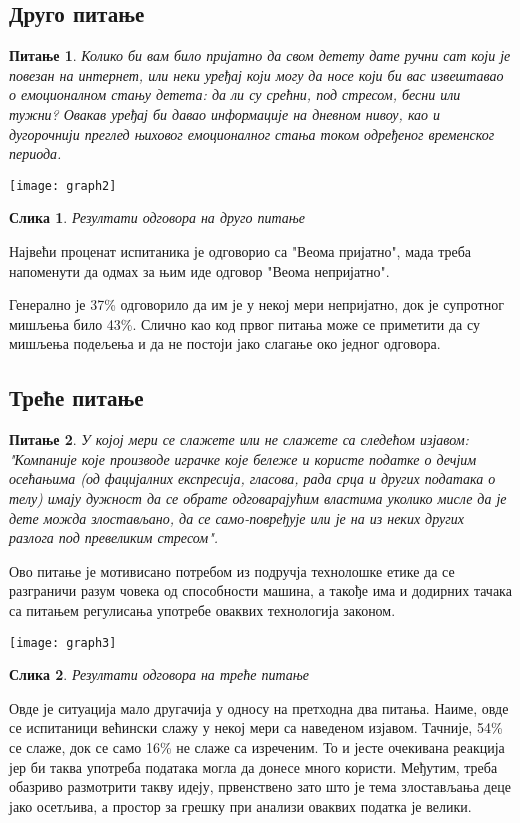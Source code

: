\documentclass{article}
\newtheorem{question}{Питање}
\newtheorem{image}{Слика}
\begin{document}
\subsection{Друго питање}
\begin{question}
Колико би вам било пријатно да свом детету дате ручни сат који је повезан на интернет, или неки уређај који могу да носе који би вас извештавао о емоционалном стању детета: да ли су срећни, под стресом, бесни или тужни? Овакав уређај би давао информације на дневном нивоу, као и дугорочнији преглед њиховог емоционалног стања током одређеног временског периода.
\end{question}
\texttt{[image: graph2]}
\begin{image}
\centering
Резултати одговора на друго питање
\end{image}

Највећи проценат испитаника је одговорио са "Веома пријатно", мада треба напоменути да одмах за њим иде одговор "Веома непријатно". 

Генерално је 37\% одговорило да им је у некој мери непријатно, док је супротног мишљења било 43\%. Слично као код првог питања може се приметити да су мишљења подељења и да не постоји јако слагање око једног одговора.


\subsection{Треће питање}
\begin{question}
У којој мери се слажете или не слажете са следећом изјавом: "Компаније које производе играчке које бележе и користе податке о дечјим осећањима (од фацијалних експресија, гласова, рада срца и других података о телу) имају дужност да се обрате одговарајућим  властима уколико мисле да је дете можда злостављано, да се само-повређује или је на из неких других разлога под превеликим стресом".
\end{question}

Ово питање је мотивисано потребом из подручја технолошке етике да се разграничи разум човека од способности машина, а такође има и додирних тачака са питањем регулисања употребе оваквих технологија законом.

\texttt{[image: graph3]}
\begin{image}
\centering
Резултати одговора на треће питање
\end{image}

Овде је ситуација мало другачија у односу на претходна два питања. Наиме, овде се испитаници већински слажу у некој мери са наведеном изјавом. Тачније, 54\% се слаже, док се само 16\% не слаже са изреченим. То и јесте очекивана реакција јер би таква употреба података могла да донесе много користи. Међутим, треба обазриво размотрити такву идеју, првенствено зато што је тема злостављања деце јако осетљива, а простор за грешку при анализи оваквих податка је велики.
\end{document}
